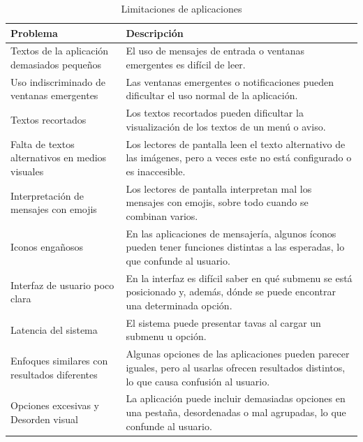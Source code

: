 \documentclass[lettersize,journal]{IEEEtran}
\begin{document}
\begin{itemize}
		\begin{table}[ht]
			\centering
			\caption{Limitaciones de aplicaciones}
			\label{tab:limitaciones-aplicaciones}
			\begin{tabular}{|p{2cm}|p{6cm}|}
				\hline
				\textbf{Problema} & \textbf{Descripción} \\
				\hline
				Textos de la aplicación demasiados pequeños & El uso de mensajes de entrada o ventanas emergentes es difícil de leer. \\
				\hline
				Uso indiscriminado de ventanas emergentes & Las ventanas emergentes o notificaciones pueden dificultar el uso normal de la aplicación. \\
				\hline
				Textos recortados & Los textos recortados pueden dificultar la visualización de los textos de un menú o aviso. \\
				\hline
				Falta de textos alternativos en medios visuales & Los lectores de pantalla leen el texto alternativo de las imágenes, pero a veces este no está configurado o es inaccesible. \\
				\hline
				Interpretación de mensajes con emojis & Los lectores de pantalla interpretan mal los mensajes con emojis, sobre todo cuando se combinan varios. \\
				\hline
				Iconos engañosos & En las aplicaciones de mensajería, algunos íconos pueden tener funciones distintas a las esperadas, lo que confunde al usuario. \\
				\hline
				Interfaz de usuario poco clara & En la interfaz es difícil saber en qué submenu se está posicionado y, además, dónde se puede encontrar una determinada opción. \\
				\hline
				Latencia del sistema & El sistema puede presentar tavas al cargar un submenu u opción. \\
				\hline
				Enfoques similares con resultados diferentes & Algunas opciones de las aplicaciones pueden parecer iguales, pero al usarlas ofrecen resultados distintos, lo que causa confusión al usuario. \\
				\hline
				Opciones excesivas y Desorden visual & La aplicación puede incluir demasiadas opciones en una pestaña, desordenadas o mal agrupadas, lo que confunde al usuario. \\
				\hline
			\end{tabular}
		\end{table}
		

\end{itemize}
\end{document}
